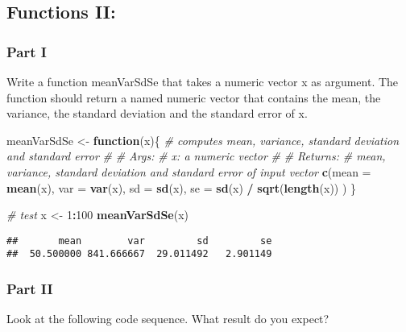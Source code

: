 \documentclass[12,]{article}
\newenvironment{Shaded}{\begin{snugshade}}{\end{snugshade}}
\newcommand{\KeywordTok}[1]{\textcolor[rgb]{0.13,0.29,0.53}{\textbf{#1}}}
\newcommand{\DataTypeTok}[1]{\textcolor[rgb]{0.13,0.29,0.53}{#1}}
\newcommand{\DecValTok}[1]{\textcolor[rgb]{0.00,0.00,0.81}{#1}}
\newcommand{\StringTok}[1]{\textcolor[rgb]{0.31,0.60,0.02}{#1}}
\newcommand{\CommentTok}[1]{\textcolor[rgb]{0.56,0.35,0.01}{\textit{#1}}}
\newcommand{\ControlFlowTok}[1]{\textcolor[rgb]{0.13,0.29,0.53}{\textbf{#1}}}
\newcommand{\OperatorTok}[1]{\textcolor[rgb]{0.81,0.36,0.00}{\textbf{#1}}}
\newcommand{\NormalTok}[1]{#1}
\begin{document}
\subsection{Functions II:}\label{functions-ii}

\subsubsection*{Part I}\label{part-i}

Write a function meanVarSdSe that takes a numeric vector x as argument.
The function should return a named numeric vector that contains the
mean, the variance, the standard deviation and the standard error of x.

\begin{Shaded}
\begin{Highlighting}[]
\NormalTok{meanVarSdSe <-}\StringTok{ }\ControlFlowTok{function}\NormalTok{(x)\{}
  \CommentTok{# computes mean, variance, standard deviation and standard error }
  \CommentTok{#}
  \CommentTok{# Args:}
  \CommentTok{#   x: a numeric vector}
  \CommentTok{#}
  \CommentTok{# Returns:}
  \CommentTok{#   mean, variance, standard deviation and standard error of input vector}
  \KeywordTok{c}\NormalTok{(}\DataTypeTok{mean =} \KeywordTok{mean}\NormalTok{(x),}
    \DataTypeTok{var =} \KeywordTok{var}\NormalTok{(x),}
    \DataTypeTok{sd =} \KeywordTok{sd}\NormalTok{(x),}
    \DataTypeTok{se =} \KeywordTok{sd}\NormalTok{(x) }\OperatorTok{/}\StringTok{ }\KeywordTok{sqrt}\NormalTok{(}\KeywordTok{length}\NormalTok{(x))}
\NormalTok{  )}
\NormalTok{\}}

\CommentTok{# test}
\NormalTok{x <-}\StringTok{ }\DecValTok{1}\OperatorTok{:}\DecValTok{100}
\KeywordTok{meanVarSdSe}\NormalTok{(x)}
\end{Highlighting}
\end{Shaded}

\begin{verbatim}
##       mean        var         sd         se 
##  50.500000 841.666667  29.011492   2.901149
\end{verbatim}

\subsubsection*{Part II}\label{part-ii}

Look at the following code sequence. What result do you expect?
\end{document}
